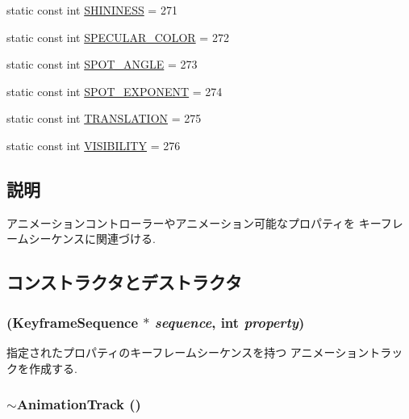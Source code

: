 \begin{CompactItemize}
static const int \hyperlink{classm3g_1_1AnimationTrack_f0b58ddb4173a8d2f5a730dab30e6c6f}{SHININESS} = 271
\item 
static const int \hyperlink{classm3g_1_1AnimationTrack_a0119030157ee8a5ef4f8ce88771447b}{SPECULAR\_\-COLOR} = 272
\item 
static const int \hyperlink{classm3g_1_1AnimationTrack_c1d6b5313ef35ef100889ca885901db2}{SPOT\_\-ANGLE} = 273
\item 
static const int \hyperlink{classm3g_1_1AnimationTrack_90c55bd356e55166244416c6f758ea94}{SPOT\_\-EXPONENT} = 274
\item 
static const int \hyperlink{classm3g_1_1AnimationTrack_a691826dccd8c22144e61216de4f680c}{TRANSLATION} = 275
\item 
static const int \hyperlink{classm3g_1_1AnimationTrack_f248c44b5d4962472c6533cdeffc6fe9}{VISIBILITY} = 276
\end{CompactItemize}


\subsection{説明}
アニメーションコントローラーやアニメーション可能なプロパティを キーフレームシーケンスに関連づける. 

\subsection{コンストラクタとデストラクタ}
\hypertarget{classm3g_1_1AnimationTrack_e27012f60e982597d6e504c488e51106}{
\subsubsection[{AnimationTrack}]{ ({\bf KeyframeSequence} $\ast$ {\em sequence}, \/  int {\em property})}}
\label{classm3g_1_1AnimationTrack_e27012f60e982597d6e504c488e51106}


指定されたプロパティのキーフレームシーケンスを持つ アニメーショントラックを作成する. \hypertarget{classm3g_1_1AnimationTrack_f7f1bc360c298d4a2f2436889159205c}{
\subsubsection[{$\sim$AnimationTrack}]{\setlength{\rightskip}{0pt plus 5cm}$\sim${\bf AnimationTrack} ()}}
\label{classm3g_1_1AnimationTrack_f7f1bc360c298d4a2f2436889159205c}


